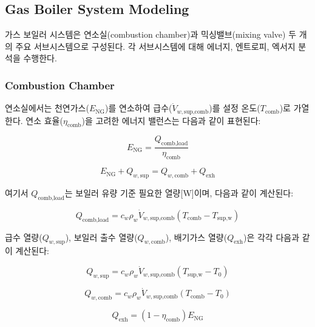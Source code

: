 \documentclass[final,5p,times,twocolumn,authoryear]{elsarticle}
\begin{document}
\subsection{Gas Boiler System Modeling}

가스 보일러 시스템은 연소실(combustion chamber)과 믹싱밸브(mixing valve) 두 개의 주요 서브시스템으로 구성된다. 각 서브시스템에 대해 에너지, 엔트로피, 엑서지 분석을 수행한다.

\subsubsection{Combustion Chamber}

연소실에서는 천연가스($E_{\text{NG}}$)를 연소하여 급수($\dot{V}_{w,\text{sup,comb}}$)를 설정 온도($T_{\text{comb}}$)로 가열한다. 연소 효율($\eta_{\text{comb}}$)을 고려한 에너지 밸런스는 다음과 같이 표현된다:

\begin{equation}
\label{eq:gb_energy_comb}
E_{\text{NG}} = \frac{Q_{\text{comb,load}}}{\eta_{\text{comb}}}
\end{equation}

\begin{equation}
\label{eq:gb_energy_balance_comb}
E_{\text{NG}} + Q_{w,\text{sup}} = Q_{w,\text{comb}} + Q_{\text{exh}}
\end{equation}

여기서 $Q_{\text{comb,load}}$는 보일러 유량 기준 필요한 열량[W]이며, 다음과 같이 계산된다:


\begin{equation}
\label{eq:gb_comb_load}
Q_{\text{comb,load}} = c_w \rho_w \dot{V}_{w,\text{sup,comb}} (T_{\text{comb}} - T_{\text{sup,w}})
\end{equation}

급수 열량($Q_{w,\text{sup}}$), 보일러 출수 열량($Q_{w,\text{comb}}$), 배기가스 열량($Q_{\text{exh}}$)은 각각 다음과 같이 계산된다:

\begin{equation}
\label{eq:gb_qw_sup}
Q_{w,\text{sup}} = c_w \rho_w \dot{V}_{w,\text{sup,comb}} (T_{\text{sup,w}} - T_0)
\end{equation}

\begin{equation}
\label{eq:gb_qw_comb}
Q_{w,\text{comb}} = c_w \rho_w \dot{V}_{w,\text{sup,comb}} (T_{\text{comb}} - T_0)
\end{equation}

\begin{equation}
\label{eq:gb_qexh}
Q_{\text{exh}} = (1 - \eta_{\text{comb}}) E_{\text{NG}}
\end{equation}
\end{document}
